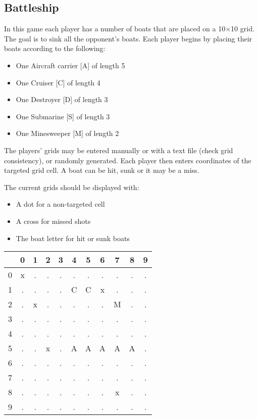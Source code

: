 \documentclass{ecnreport}
\begin{document}
\subsection{Battleship}

In this game each player has a number of boats that are placed on a 10$\times$10 grid. The goal is to sink all the opponent's boats.
Each player begins by placing their boats according to the following:
\begin{itemize}
 \item One Aircraft carrier [A] of length 5
 \item One Cruiser [C] of length 4
 \item One Destroyer [D] of length 3
 \item One Submarine [S] of length 3
 \item One Minesweeper [M] of length 2
\end{itemize}

The players' grids may be entered manually or with a text file (check grid consistency), or randomly generated.
Each player then enters coordinates of the targeted grid cell. A boat can be hit, sunk or it may be a miss. 

The current grids should be displayed with:
\begin{itemize}
 \item A dot for a non-targeted cell
 \item A cross for missed shots
 \item The boat letter for hit or sunk boats
\end{itemize}

\begin{center}
 \begin{tabular}{|c|c|c|c|c|c|c|c|c|c|c|}
 \hline 
 & 0 & 1 & 2& 3&4 &5 &6 & 7&  8&9 \\\hline
 0 &x&.&.&. &.& .&.&.&.&.\\\hline
 1 &.&.&.&. &C&C&x&.&.&.\\\hline
 2 &.&x&.&. &.&.&.&M&.&.\\\hline
 3 &.&.&.&. &.&.&.&.&.&.\\\hline
 4 &.&.&.&. &.&.&.&.&.&.\\\hline
 5 &.&.&x&. &A&A&A&A&A&.\\\hline
 6 &.&.&.&. &.&.&.&.&.&.\\\hline
 7 &.&.&.&. &.&.&.&.&.&.\\\hline
 8 &.&.&.&. &.&.&.&x&.&.\\\hline
 9 &.&.&.&. &.&.&.&.&.&.\\\hline
 \end{tabular}
\end{center}
\begin{itemize}
\end{itemize}
\end{document}

